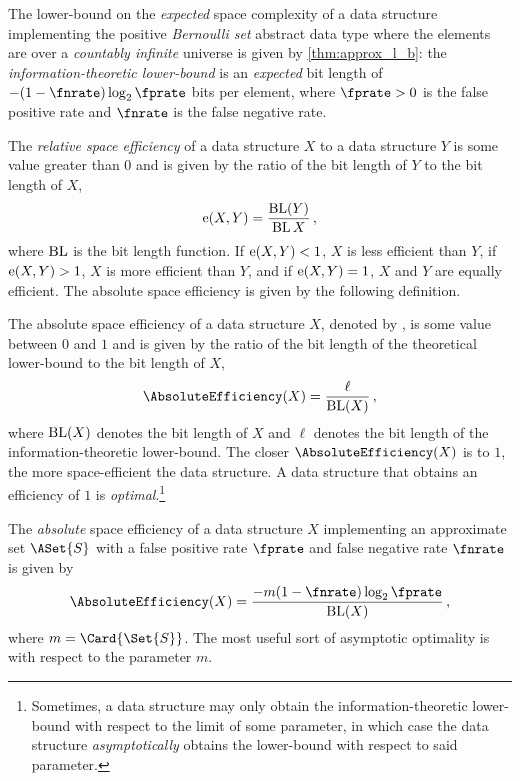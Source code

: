 \documentclass[ ../main.tex]{subfiles}
\begin{document}
The lower-bound on the \emph{expected} space complexity of a data structure
implementing the positive \emph{Bernoulli set} abstract data type where the
elements are over a \emph{countably infinite} universe is given by
\cref{thm:approx_l_b}: the \emph{information-theoretic
lower-bound} is an \emph{expected} bit
length of $-(1 - \fnrate)\log_2 \fprate$ bits per element, where $\fprate > 0$
is the false positive rate and $\fnrate$ is the
false negative rate.

The \emph{relative space efficiency} of a data 
structure $X$ to a data structure $Y$ is some value 
greater than $0$ and is given by the ratio of the bit length of $Y$ to the bit 
length of $X$,
\begin{equation}
    \operatorname{e}(X,Y) = \frac{\operatorname{BL}(Y)}{\operatorname{BL}{X}}\,,
\end{equation}
where $\operatorname{BL}$ is the bit length function. If $\operatorname{e}(X,Y) < 1$, $X$ is less efficient 
than $Y$, if $\operatorname{e}(X,Y) > 1$, $X$ is more efficient than $Y$, and if 
$\operatorname{e}(X,Y) = 1$, $X$ and $Y$ are equally efficient. The absolute space efficiency 
is given by the following definition.
\begin{definition}
The absolute space efficiency of a data structure $X$, denoted by 
, is some value between $0$ and $1$ and is given by the 
ratio of the bit length of the theoretical lower-bound to the bit length of $X$,
\begin{equation}
    \AbsoluteEfficiency(X) = \frac{\ell}{\BL(X)}\,,
\end{equation}
where $\operatorname{BL}(X)$ denotes the bit length of $X$ and $\ell$ denotes the bit length 
of the information-theoretic lower-bound. The closer $\AbsoluteEfficiency(X)$ is 
to $1$, the more space-efficient the data structure. A data structure that 
obtains an efficiency of $1$ is \emph{optimal}.\footnote{Sometimes, a data 
structure may only obtain the information-theoretic lower-bound with respect to 
the limit of some parameter, in which case the data structure 
\emph{asymptotically} obtains the lower-bound with respect to said parameter.}
\end{definition}

The \emph{absolute} space efficiency of a data structure $X$ implementing an 
approximate set $\ASet{S}$ with a false positive rate $\fprate$ and false 
negative rate $\fnrate$ is given by
\begin{equation}
    \AbsoluteEfficiency(X) = \frac{-m(1 - \fnrate)\log_2 \fprate}{\BL(X)}\,,
\end{equation}
where $m = \Card{\Set{S}}$. The most useful sort of asymptotic optimality is 
with respect to the parameter $m$.
\end{document}
